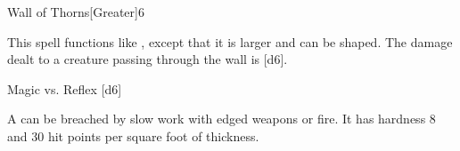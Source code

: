 \begin{spellsection}{Wall of Thorns}[Greater]{6}
    \begin{spellheader}
    \end{spellheader}
    \begin{spellcontent}
        \begin{spelltargetinginfo}
        \end{spelltargetinginfo}
        \begin{spelleffects}
            \spellspecial This spell functions like , except that it is larger and can be shaped. The damage dealt to a creature passing through the wall is [d6].
            \spelldur \durshort
        \end{spelleffects}
    \end{spellcontent}
    \begin{spellsubcontent}
        \begin{spelltargetinginfo}
        \end{spelltargetinginfo}
        \begin{spelleffects}
            \begin{spellattack}{Magic vs. Reflex}
                \spellsuccess {}[d6]
            \end{spellattack}
        \end{spelleffects}
    \end{spellsubcontent}
    \begin{spellfooter}
        \spellnotes A  can be breached by slow work with edged weapons or fire. It has hardness 8 and 30 hit points per square foot of thickness.

        \physicalspellnotes
        \miscastexplode
    \end{spellfooter}
\end{spellsection}


